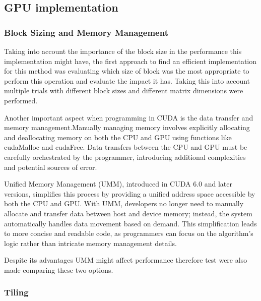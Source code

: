 \documentclass[12p,english]{article}
\begin{document}
\newpage

\subsection{GPU implementation}
\subsubsection{Block Sizing and Memory Management }
Taking into account the importance of the block size in the performance this implementation might have, the first approach to find an efficient implementation for this method was evaluating which size of block was the most appropriate to perform this operation and evaluate the impact it has. Taking this into account multiple trials with different block sizes and different matrix dimensions were performed. 

Another important aspect when programming in CUDA is the data transfer and memory management.Manually managing memory involves explicitly allocating and deallocating memory on both the CPU and GPU using functions like cudaMalloc and cudaFree. Data transfers between the CPU and GPU must be carefully orchestrated by the programmer, introducing additional complexities and potential sources of error.

Unified Memory Management (UMM), introduced in CUDA 6.0 and later versions, simplifies this process by providing a unified address space accessible by both the CPU and GPU. With UMM, developers no longer need to manually allocate and transfer data between host and device memory; instead, the system automatically handles data movement based on demand. This simplification leads to more concise and readable code, as programmers can focus on the algorithm's logic rather than intricate memory management details.

Despite its advantages UMM might affect performance therefore test were also made comparing these two options.



\subsubsection{Tiling}
\end{document}
